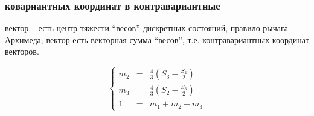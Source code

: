 \documentclass[14pt]{beamer}
\begin{document}
\begin{frame}
\frametitle{ ковариантных координат в контравариантные}

\begin{itemize}
	 вектор -- есть центр тяжести \enquote{весов} дискретных состояний, правило рычага Архимеда;%
	 вектор есть векторная сумма \enquote{весов}, т.е. контравариантных координат векторов.
\end{itemize}
$$
        \left\{
        \begin{array}{lcl}
                m_2 &=& {\displaystyle \frac{4}{3}\left(S_3 - \frac{S_2}{2}\right)} \\
                m_3 &=& {\displaystyle \frac{4}{3}\left(S_2 - \frac{S_3}{2}\right)} \\
		1 &=& m_1 + m_2 + m_3 
        \end{array}
        \right.
$$
\end{frame}
\end{document}
